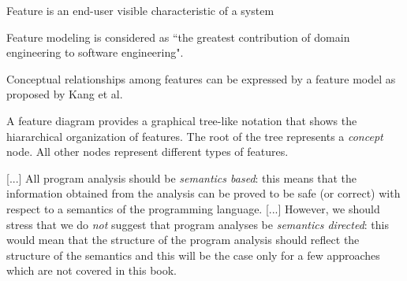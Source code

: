 Feature is an end-user visible characteristic of a system \cite{book:introduction-to-spl}

Feature modeling is considered as ``the greatest contribution of domain engineering to software engineering". \cite{art:formal-semantics-and-verification-for-feature-modeling}

Conceptual relationships among features can be expressed by a feature model as proposed by Kang et al. \cite{art:formal-semantics-and-verification-for-feature-modeling}

A feature diagram provides a graphical tree-like notation that shows the hiararchical organization of features. The root of the tree represents a \textit{concept} node. All other nodes represent different types of features. \cite{art:formal-semantics-and-verification-for-feature-modeling}

[...] All program analysis should be \emph{semantics based}: this means that the information obtained from the analysis can be proved to be safe (or correct) with respect to a semantics of the programming language. [...] However, we should stress that we do \emph{not} suggest that program analyses be \emph{semantics directed}: this would mean that the structure of the program analysis should reflect the structure of the semantics and this will be the case only for a few approaches which are not covered in this book. \cite{book:principles-of-program-analysis}
